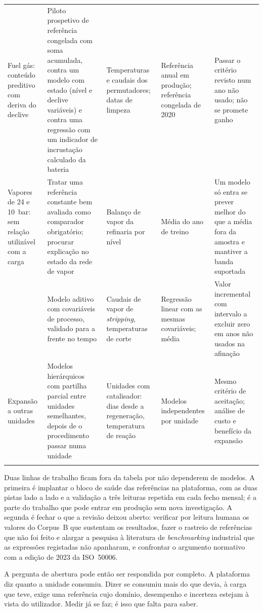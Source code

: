 {\begin{xltabular}{\textwidth}{@{}>{\raggedright\arraybackslash}p{2.6cm}>{\raggedright\arraybackslash}X>{\raggedright\arraybackslash}p{2.6cm}>{\raggedright\arraybackslash}p{2.4cm}>{\raggedright\arraybackslash}X@{}}
    \addlinespace
    Fuel gás: conteúdo preditivo com deriva do declive & Piloto prospetivo de referência congelada com soma acumulada, contra um modelo com estado (nível e declive variáveis) e contra uma regressão com um indicador de incrustação calculado da bateria & Temperaturas e caudais dos permutadores; datas de limpeza & Referência anual em produção; referência congelada de 2020 & Passar o critério revisto num ano não usado; não se promete ganho \\
    \addlinespace
    Vapores de 24 e 10~bar: sem relação utilizável com a carga & Tratar uma referência constante bem avaliada como comparador obrigatório; procurar explicação no estado da rede de vapor & Balanço de vapor da refinaria por nível & Média do ano de treino & Um modelo só entra se prever melhor do que a média fora da amostra e mantiver a banda suportada \\
    \addlinespace
     & Modelo aditivo com covariáveis de processo, validado para a frente no tempo & Caudais de vapor de \emph{stripping}, temperaturas de corte & Regressão linear com as mesmas covariáveis; média & Valor incremental com intervalo a excluir zero em anos não usados na afinação \\
    \addlinespace
    Expansão a outras unidades & Modelos hierárquicos com partilha parcial entre unidades semelhantes, depois de o procedimento passar numa unidade & Unidades com catalisador: dias desde a regeneração, temperatura de reação & Modelos independentes por unidade & Mesmo critério de aceitação; análise de custo e benefício da expansão \\ \\
\end{xltabular}
}

Duas linhas de trabalho ficam fora da tabela por não dependerem de modelos.
A primeira é implantar o bloco de saúde das referências na plataforma, com
as duas pistas lado a lado e a validação a três leituras repetida em cada
fecho mensal; é a parte do trabalho que pode entrar em produção sem nova
investigação. A segunda é fechar o que a revisão deixou aberto: verificar por
leitura humana os valores do Corpus~B que sustentam os resultados, fazer o
rastreio de referências que não foi feito e alargar a pesquisa à literatura
de \emph{benchmarking} industrial que as expressões registadas não
apanharam, e confrontar o argumento normativo com a edição de 2023 da
ISO~50006.

A pergunta de abertura pode então ser respondida por completo. A plataforma
diz quanto a unidade consumiu. Dizer se consumiu mais do que devia, à carga
que teve, exige uma referência cujo domínio, desempenho e incerteza estejam
à vista do utilizador. Medir já se faz; é isso que falta para saber.
